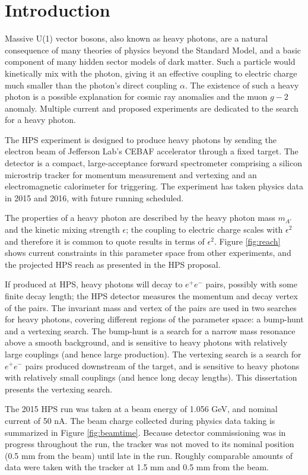 \chapter{Introduction}
Massive U(1) vector bosons, also known as heavy photons, are a natural consequence of many theories of physics beyond the Standard Model, and a basic component of many hidden sector models of dark matter.
Such a particle would kinetically mix with the photon, giving it an effective coupling to electric charge much smaller than the photon's direct coupling $\alpha$.
The existence of such a heavy photon is a possible explanation for cosmic ray anomalies and the muon $g-2$ anomaly.
Multiple current and proposed experiments are dedicated to the search for a heavy photon.

The HPS experiment is designed to produce heavy photons by sending the electron beam of Jefferson Lab's CEBAF accelerator through a fixed target.
The detector is a compact, large-acceptance forward spectrometer comprising a silicon microstrip tracker for momentum measurement and vertexing and an electromagnetic calorimeter for triggering.
The experiment has taken physics data in 2015 and 2016, with future running scheduled.

The properties of a heavy photon are described by the heavy photon mass $m_{A'}$ and the kinetic mixing strength $\epsilon$; the coupling to electric charge scales with $\epsilon^2$ and therefore it is common to quote results in terms of $\epsilon^2$.
Figure \ref{fig:reach} shows current constraints in this parameter space from other experiments, and the projected HPS reach as presented in the HPS proposal.

If produced at HPS, heavy photons will decay to $e^+e^-$ pairs, possibly with some finite decay length; the HPS detector measures the momentum and decay vertex of the pairs.
The invariant mass and vertex of the pairs are used in two searches for heavy photons, covering different regions of the parameter space: a bump-hunt and a vertexing search.
The bump-hunt is a search for a narrow mass resonance above a smooth background, and is sensitive to heavy photons with relatively large couplings (and hence large production).
The vertexing search is a search for $e^+e^-$ pairs produced downstream of the target, and is sensitive to heavy photons with relatively small couplings (and hence long decay lengths).
This dissertation presents the vertexing search.

The 2015 HPS run was taken at a beam energy of 1.056 GeV, and nominal current of 50 nA.
The beam charge collected during physics data taking is summarized in Figure \ref{fig:beamtime}.
Because detector commissioning was in progress throughout the run, the tracker was not moved to its nominal position (0.5 mm from the beam) until late in the run.
Roughly comparable amounts of data were taken with the tracker at 1.5 mm and 0.5 mm from the beam.

